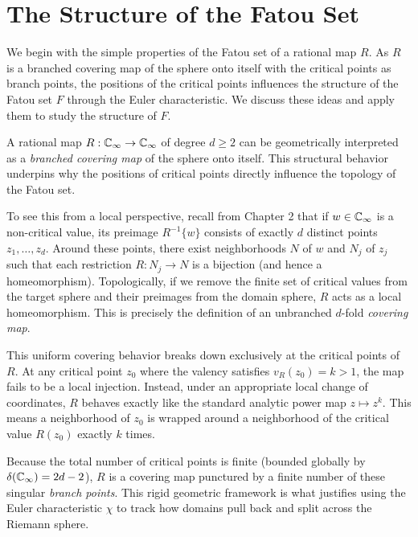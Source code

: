 \chapter{The Structure of the Fatou Set}
\label{chp:the_structure_of_the_Fatou_set}

We begin with the simple properties of the Fatou set of a rational map $R$. As
$R$ is a branched covering map of the sphere onto itself with the critical
points as branch points, the positions of the critical points influences the
structure of the Fatou set $F$ through the Euler characteristic. We discuss
these ideas and apply them to study the structure of $F$.

\begin{remark}
    A rational map $R: \mathbb{C}_\infty \to \mathbb{C}_\infty$ of degree $d \geq 2$ can be
    geometrically interpreted as a \emph{branched covering map} of the sphere
    onto itself. This structural behavior underpins why the positions of
    critical points directly influence the topology of the Fatou set.
    
    To see this from a local perspective, recall from Chapter 2 that if $w \in
    \mathbb{C}_\infty$ is a non-critical value, its preimage $R^{-1}\{w\}$ consists of
    exactly $d$ distinct points $z_1, \dots, z_d$. Around these points, there
    exist neighborhoods $N$ of $w$ and $N_j$ of $z_j$ such that each restriction
    $R: N_j \to N$ is a bijection (and hence a homeomorphism). Topologically, if
    we remove the finite set of critical values from the target sphere and their
    preimages from the domain sphere, $R$ acts as a local homeomorphism. This is
    precisely the definition of an unbranched $d$-fold \emph{covering map}.
    
    This uniform covering behavior breaks down exclusively at the critical
    points of $R$. At any critical point $z_0$ where the valency satisfies
    $v_R(z_0) = k > 1$, the map fails to be a local injection. Instead, under an
    appropriate local change of coordinates, $R$ behaves exactly like the
    standard analytic power map $z \mapsto z^k$. This means a neighborhood of
    $z_0$ is wrapped around a neighborhood of the critical value $R(z_0)$
    exactly $k$ times.
    
    Because the total number of critical points is finite (bounded globally by
    $\delta(\mathbb{C}_\infty) = 2d - 2$), $R$ is a covering map punctured by a finite
    number of these singular \emph{branch points}. This rigid geometric
    framework is what justifies using the Euler characteristic $\chi$ to track
    how domains pull back and split across the Riemann sphere.
\end{remark}

